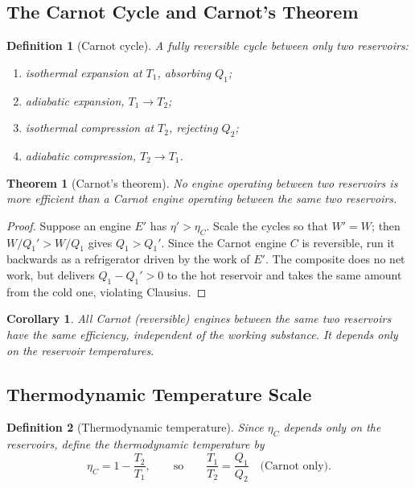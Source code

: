 \documentclass{article}
\newtheorem{theorem}{Theorem}
\newtheorem{corollary}{Corollary}[theorem]
\newtheorem{definition}{Definition}
\begin{document}
\subsection{The Carnot Cycle and Carnot's Theorem}
\begin{definition}[Carnot cycle]
    A fully reversible cycle between only two reservoirs:
    \begin{enumerate}
        \item isothermal expansion at $T_1$, absorbing $Q_1$;
        \item adiabatic expansion, $T_1 \to T_2$;
        \item isothermal compression at $T_2$, rejecting $Q_2$;
        \item adiabatic compression, $T_2 \to T_1$.
    \end{enumerate}
\end{definition}

\begin{theorem}[Carnot's theorem]
    No engine operating between two reservoirs is more efficient than a Carnot engine operating between the same two reservoirs.
\end{theorem}
\begin{proof}
    Suppose an engine $E'$ has $\eta' > \eta_C$. Scale the cycles so that $W' = W$; then $W/Q_1' > W/Q_1$ gives $Q_1 > Q_1'$. Since the Carnot engine $C$ is reversible, run it backwards as a refrigerator driven by the work of $E'$. The composite does no net work, but delivers $Q_1 - Q_1' > 0$ to the hot reservoir and takes the same amount from the cold one, violating Clausius.
\end{proof}

\begin{corollary}
    All Carnot (reversible) engines between the same two reservoirs have the same efficiency, independent of the working substance. It depends only on the reservoir temperatures.
\end{corollary}

\subsection{Thermodynamic Temperature Scale}
\begin{definition}[Thermodynamic temperature]
    Since $\eta_C$ depends only on the reservoirs, define the thermodynamic temperature by
    \[\eta_C = 1 - \frac{T_2}{T_1}, \qquad \text{so} \qquad \frac{T_1}{T_2} = \frac{Q_1}{Q_2} \quad \text{(Carnot only)}.\]
\end{definition}
\end{document}
